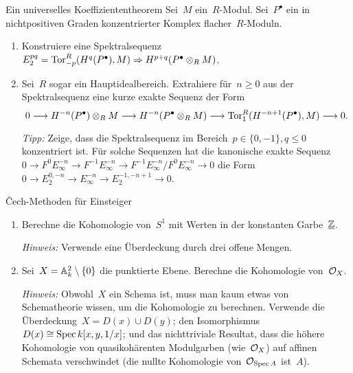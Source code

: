 \documentclass{uebblatt}
\begin{document}

\begin{aufgabe}{Ein universelles Koeffiziententheorem}
Sei~$M$ ein~$R$-Modul. Sei~$P^\bullet$ ein in nichtpositiven Graden
konzentrierter Komplex flacher~$R$-Moduln.
\begin{enumerate}
\item Konstruiere eine Spektralsequenz $E_2^{pq} =
\Tor_{-p}^R(H^q(P^\bullet),M) \Rightarrow H^{p+q}(P^\bullet \otimes_R M)$.
\item Sei~$R$ sogar ein Hauptidealbereich. Extrahiere für~$n \geq 0$ aus der
Spektralsequenz eine kurze exakte Sequenz der Form
\[ 0 \lra H^{-n}(P^\bullet) \otimes_R M \lra H^{-n}(P^\bullet \otimes_R M)
  \lra \Tor_1^R(H^{-n+1}(P^\bullet), M) \lra 0. \]
{\tiny\emph{Tipp:} Zeige, dass die Spektralsequenz im Bereich~$p \in \{ 0,-1
\}, q \leq 0$ konzentriert ist. Für solche Sequenzen hat die
kanonische exakte Sequenz $0 \to F^0 E_\infty^{-n} \to F^{-1}
E_\infty^{-n} \to F^{-1} E_\infty^{-n} / F^0 E_\infty^{-n} \to 0$ die Form
$0 \to E_2^{0,-n} \to E_\infty^{-n} \to E_2^{-1,-n+1} \to 0$.\par}
\end{enumerate}
\end{aufgabe}

\begin{aufgabe}{Čech-Methoden für Einsteiger}
\begin{enumerate}
\item Berechne die Kohomologie von~$S^1$ mit Werten in der konstanten Garbe~$\ul{\ZZ}$.

{\tiny\emph{Hinweis:} Verwende eine Überdeckung durch drei offene Mengen.\par}

\item Sei~$X = \AA^2_k \setminus \{0\}$ die punktierte Ebene.
Berechne die Kohomologie von~$\O_X$.

{\tiny\emph{Hinweis:} Obwohl~$X$ ein Schema ist, muss man kaum etwas von
Schematheorie wissen, um die Kohomologie zu berechnen. Verwende die
Überdeckung~$X = D(x) \cup D(y)$; den Isomorphismus~$D(x) \cong \Spec
k[x,y,1/x]$; und das nichttriviale Resultat, dass die höhere Kohomologie von
quasikohärenten Modulgarben (wie~$\O_X$) auf affinen Schemata
verschwindet (die nullte Kohomologie von~$\O_{\Spec A}$ ist~$A$).\par}
\end{enumerate}
\end{aufgabe}
\end{document}

